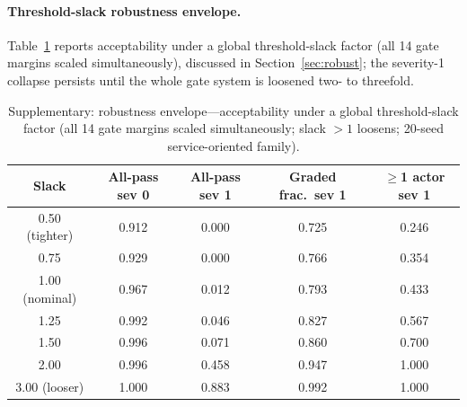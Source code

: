 \documentclass[12pt]{article}
\begin{document}
\begin{table}[H]
\centering
\caption{Supplementary: targeted 28-day behavioral severity confirmation (35\% capacity, five seeds, 672 h horizon).}
\label{tab:target28}
\end{table}

\paragraph{Threshold-slack robustness envelope.} Table~\ref{tab:envelope} reports acceptability under a global threshold-slack factor (all 14 gate margins scaled simultaneously), discussed in Section~\ref{sec:robust}; the severity-1 collapse persists until the whole gate system is loosened two- to threefold.

\begin{table}[H]
\centering
\caption{Supplementary: robustness envelope---acceptability under a global threshold-slack factor (all 14 gate margins scaled simultaneously; slack $>1$ loosens; 20-seed service-oriented family).}
\label{tab:envelope}
\begin{tabular}{ccccc}
\hline
Slack & All-pass sev 0 & All-pass sev 1 & Graded frac.\ sev 1 & $\geq$1 actor sev 1 \\
\hline
0.50 (tighter) & 0.912 & 0.000 & 0.725 & 0.246 \\
0.75 & 0.929 & 0.000 & 0.766 & 0.354 \\
1.00 (nominal) & 0.967 & 0.012 & 0.793 & 0.433 \\
1.25 & 0.992 & 0.046 & 0.827 & 0.567 \\
1.50 & 0.996 & 0.071 & 0.860 & 0.700 \\
2.00 & 0.996 & 0.458 & 0.947 & 1.000 \\
3.00 (looser) & 1.000 & 0.883 & 0.992 & 1.000 \\
\hline
\end{tabular}
\end{table}
\end{document}
